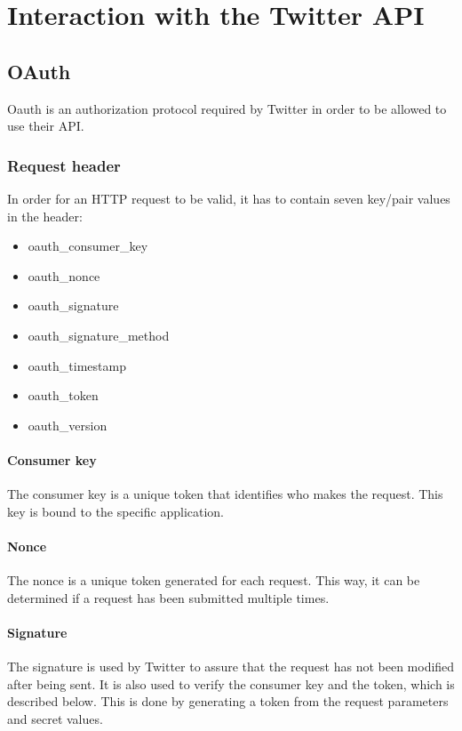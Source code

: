 \chapter{Interaction with the Twitter \ac{API}}

\section{OAuth}
Oauth is an authorization protocol required by Twitter in order to be allowed to
use their \ac{API}. 

\subsection{Request header}
In order for an \ac{HTTP} request to be valid, it has to
contain seven key/pair values in the header:
\begin{itemize}
  \item oauth\_consumer\_key
  \item oauth\_nonce
  \item oauth\_signature
  \item oauth\_signature\_method
  \item oauth\_timestamp
  \item oauth\_token
  \item oauth\_version
\end{itemize}

\subsubsection*{Consumer key}
The consumer key is a unique token that identifies who makes the request.
This key is bound to the specific application.

\subsubsection*{Nonce}
The nonce is a unique token generated for each request. This way, it can be
determined if a request has been submitted multiple times. 

\subsubsection*{Signature}
The signature is used by Twitter to assure that the request has not been
modified after being sent. It is also used to verify the consumer key and the
token, which is described below.
This is done by generating a token from the request parameters and secret values.
 
